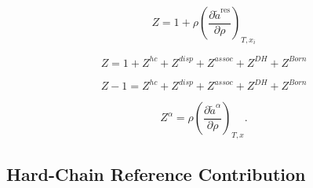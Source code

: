 \documentclass[12pt, letterpaper]{article}
\begin{document}

\begin{equation}
    Z=1+\rho\left(\frac{\partial\tilde{a}^\mathrm{res}}{\partial\rho}\right)_{T,x_{i}}
    \label{eq:z_from_rho}
\end{equation}


\begin{equation}
    Z = 1 + Z^{hc} + Z^{disp} + Z^{assoc} + Z^{DH} + Z^{Born}
    \label{eq:z_total}
\end{equation}


\begin{equation}
    Z - 1 = Z^{hc} + Z^{disp} + Z^{assoc} + Z^{DH} + Z^{Born}
    \label{eq:z_minus_one_sum}
\end{equation}


\begin{equation}
    Z^\alpha =\rho\left(\frac{\partial\tilde{a}^\alpha}{\partial\rho}\right)_{T,x}
    .
    \label{eq:z_alpha}
\end{equation}

\subsection{Hard-Chain Reference Contribution}
\end{document}
